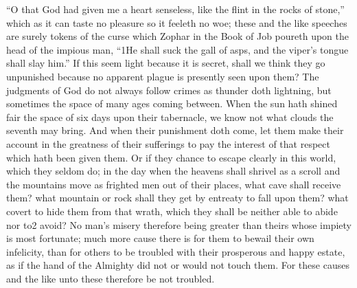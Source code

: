 “O that God had given me a heart senseless, like the flint in the rocks of stone,” which as it can taste no pleasure so it feeleth no woe; these and the like speeches are surely tokens of the curse which Zophar in the Book of Job poureth upon the head of the impious man, “1He shall suck the gall of asps, and the viper’s tongue shall slay him.” If this seem light because it is secret, shall we think they go unpunished because no apparent plague is presently seen upon them? The judgments of God do not always follow crimes as thunder doth lightning, but sometimes the space of many ages coming between. When the sun hath shined fair the space of six days upon their tabernacle, we know not what clouds the seventh may bring. And when their punishment doth come, let them make their account in the greatness of their sufferings to pay the interest of that respect which hath been given them. Or if they chance to escape clearly in this world, which they seldom do; in the day when the heavens shall shrivel as a scroll and the mountains move as frighted men out of their places, what cave shall receive them? what mountain or rock shall they get by entreaty to fall upon them? what covert to hide them from that wrath, which they shall be neither able to abide nor to2 avoid? No man’s misery therefore being greater than theirs whose impiety is most fortunate; much more cause there is for them to bewail their own infelicity, than for others to be troubled with their prosperous and happy estate, as if the hand of the Almighty did not or would not touch them. For these causes and the like unto these therefore be not troubled.


